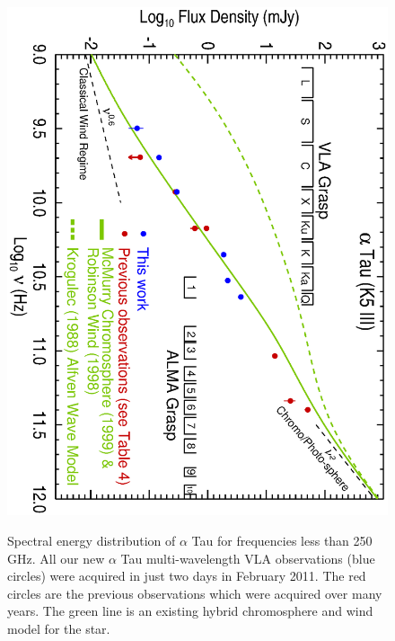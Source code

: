\documentclass[iop]{emulateapj}
\begin{document}
\begin{figure}
\includegraphics[trim = 0mm 0mm 0mm 20mm, clip,scale=0.65, angle=90]{fig2.ps}
\\
\caption{Spectral energy distribution of $\alpha$ Tau for frequencies less than 250 GHz. All our new $\alpha$ Tau multi-wavelength VLA observations (blue circles) were acquired in just two days in February 2011. The red circles are the previous observations which were acquired over many years. The green line is an existing hybrid chromosphere and wind model for the star.}
\label{fig:fig2}
\end{figure}
\end{document}
